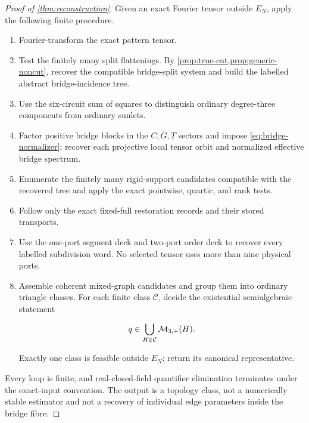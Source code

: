 \begin{proof}[Proof of \cref{thm:reconstruction}]
Given an exact Fourier tensor outside \(E_N\), apply the following finite
procedure.

\begin{enumerate}[label=\textbf{R\arabic*.}]
  \item Fourier-transform the exact pattern tensor.
  \item Test the finitely many split flattenings.  By
        \cref{prop:true-cut,prop:generic-noncut}, recover the compatible
        bridge-split system and build the labelled abstract bridge-incidence
        tree.
  \item Use the six-circuit sum of squares to distinguish ordinary
        degree-three components from ordinary sunlets.
  \item Factor positive bridge blocks in the \(C,G,T\) sectors and impose
        \eqref{eq:bridge-normalizer}; recover each projective local tensor
        orbit and normalized effective bridge spectrum.
  \item Enumerate the finitely many rigid-support candidates compatible with
        the recovered tree and apply the exact pointwise, quartic, and rank
        tests.
  \item Follow only the exact fixed-full restoration records and their stored
        transports.
  \item Use the one-port segment deck and two-port order deck to recover every
        labelled subdivision word.  No selected tensor uses more than nine
        physical ports.
  \item Assemble coherent mixed-graph candidates and group them into ordinary
        triangle classes.  For each finite class \(\mathcal C\), decide the
        existential semialgebraic statement

        \[
          q\in\bigcup_{H\in\mathcal C}\mathcal M_{3,+}(H).
        \]

        Exactly one class is feasible outside \(E_N\); return its canonical
        representative.
\end{enumerate}

Every loop is finite, and real-closed-field quantifier elimination terminates
under the exact-input convention.  The output is a topology class, not a
numerically stable estimator and not a recovery of individual edge parameters
inside the bridge fibre.
\end{proof}
